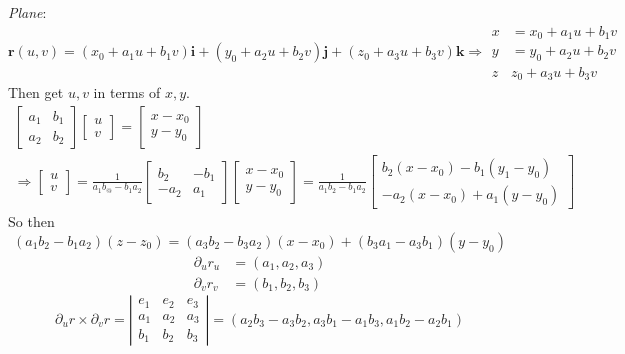 \documentclass[twoside]{amsart}
\theoremstyle{plain}
\theoremstyle{definition}
\newcommand{\exercisehead}[1]
  {
   \noindent{\small\bf Exercise #1.}
   \smallskip}
\begin{document}
\exercisehead{1} \emph{Plane}:
\[
\mathbf{r}(u,v) = (x_0 + a_1 u + b_1 v )\mathbf{i} + (y_0 + a_2 u + b_2 v) \mathbf{j} + (z_0  + a_3 u + b_3 v) \mathbf{k} \Longrightarrow \begin{aligned} x & = x_0 + a_1 u + b_1 v \\ y & = y_0 + a_2 u + b_2 v \\ z & z_0 + a_3 u + b_3 v \end{aligned}
\]
Then get $u,v$ in terms of $x,y$.  
\[
\begin{gathered}
  \left[ \begin{matrix} a_1 & b_1 \\ a_2 & b_2 \end{matrix} \right] \left[ \begin{matrix} u \\ v \end{matrix} \right] = \left[ \begin{matrix} x-x_0 \\ y - y_0 \end{matrix} \right] \\ 
  \Longrightarrow \left[ \begin{matrix} u \\ v \end{matrix} \right] = \frac{1}{ a_1 b_@ - b_1 a_2 } \left[ \begin{matrix} b_2 & -b_1 \\ -a_2 & a_1 \end{matrix} \right] \left[ \begin{matrix} x-x_0 \\ y- y_0 \end{matrix} \right] = \frac{1}{ a_1 b_2 - b_1 a_2 } \left[ \begin{matrix} b_2 ( x-x_0) - b_1 (y_1 - y_0 ) \\ -a_2 (x-x_0) + a_1 ( y-y_0) \end{matrix} \right]
\end{gathered}
\]
So then
\[
(a_1 b_2 - b_1 a_2) (z-z_0) = (a_3 b_2 - b_3 a_2)(x-x_0) + (b_3a_1 - a_3 b_1)(y-y_0)
\]
\[
\begin{aligned}
  \partial_u r_u & = (a_1,a_2,a_3) \\ 
  \partial_v r_v & = (b_1,b_2,b_3) 
\end{aligned}
\]
\[
\partial_u r \times \partial_v r = \left| \begin{matrix} e_1 & e_2 & e_3 \\ a_1 & a_2 & a_3 \\ b_1 & b_2 & b_3 \end{matrix} \right| = (a_2 b_3 - a_3 b_2, a_3 b_1 - a_1 b_3, a_1 b_2 - a_2 b_1 )
\]
\end{document}
